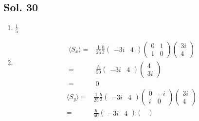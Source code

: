    \subsection*{Sol. 30}
   \begin{enumerate}
       \item $\frac{1}{5}$
       \item 
       \begin{align*}
           \langle S_x\rangle
           =&\frac{1}{25}
           \frac{\hbar}{2}
           \begin{pmatrix}
               -3i & 4
           \end{pmatrix}
           \begin{pmatrix}
               0 & 1 \\
               1 & 0
           \end{pmatrix}
           \begin{pmatrix}
               3i\\4
           \end{pmatrix}\\
           =& \frac{\hbar}{50}
           \begin{pmatrix}
               -3i & 4
           \end{pmatrix}
           \begin{pmatrix}
               4 \\ 3i
           \end{pmatrix}\\
           =&0
       \end{align*}
       \begin{align*}
           \langle S_y\rangle
           =&\frac{1}{25}
           \frac{\hbar}{2}
           \begin{pmatrix}
               -3i & 4
           \end{pmatrix}
           \begin{pmatrix}
               0 & -i \\
               i & 0
           \end{pmatrix}
           \begin{pmatrix}
               3i\\4
           \end{pmatrix}\\
           =& \frac{\hbar}{50}
           \begin{pmatrix}
               -3i & 4
           \end{pmatrix}
           \begin{pmatrix}

\end{pmatrix}
\end{align*}
\end{enumerate}
